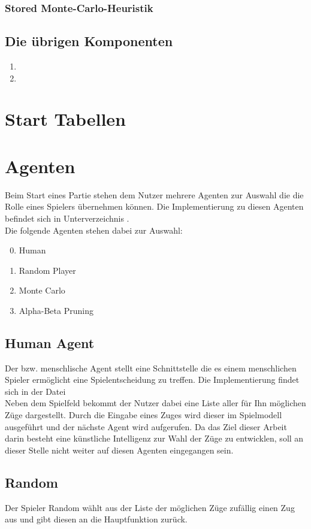 \subsubsection{Stored Monte-Carlo-Heuristik}
\subsection{Die übrigen Komponenten}
\begin{enumerate}
\item {}
\item {} 
\end{enumerate}
\section{Start Tabellen}
\section{Agenten}
Beim Start eines Partie stehen dem Nutzer mehrere Agenten zur Auswahl die die Rolle eines Spielers übernehmen können. Die Implementierung zu diesen Agenten befindet sich in Unterverzeichnis .
\\Die folgende Agenten stehen dabei zur Auswahl:
\begin{enumerate}
\setcounter{enumi}{-1}
\item Human
\item Random Player
\item Monte Carlo
\item Alpha-Beta Pruning
\end{enumerate}
\subsection{Human Agent}
Der  bzw. menschlische Agent stellt eine Schnittstelle die es einem menschlichen Spieler ermöglicht eine Spielentscheidung zu treffen. Die Implementierung findet sich in der Datei 
\\Neben dem Spielfeld bekommt der Nutzer dabei eine Liste aller für Ihn möglichen Züge dargestellt. Durch die Eingabe eines Zuges wird dieser im Spielmodell ausgeführt und der nächste Agent wird aufgerufen. Da das Ziel dieser Arbeit darin besteht eine künstliche Intelligenz zur Wahl der Züge zu entwicklen, soll an dieser Stelle nicht weiter auf diesen Agenten eingegangen sein.

\subsection{Random}
Der Spieler Random wählt aus der Liste der möglichen Züge zufällig einen Zug aus und gibt diesen an die Hauptfunktion zurück.

